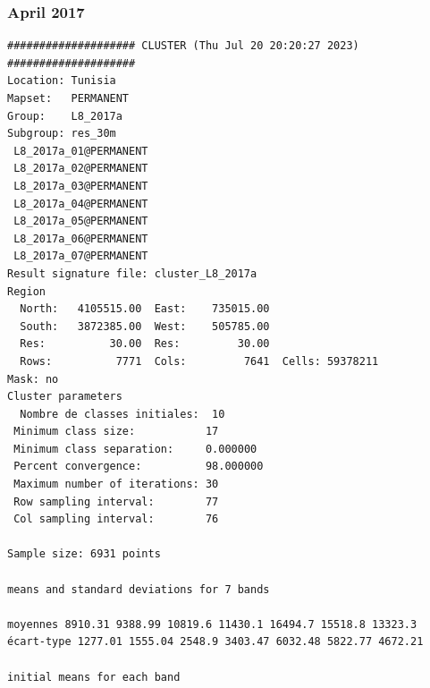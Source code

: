 \documentclass[environments,article,submit,pdftex,moreauthors]{Definitions/mdpi}
\begin{document}
\subsubsection[\appendixname~\thesubsubsection]{April 2017}
\begin{scriptsize}
\begin{verbatim}
#################### CLUSTER (Thu Jul 20 20:20:27 2023) ####################
Location: Tunisia
Mapset:   PERMANENT
Group:    L8_2017a
Subgroup: res_30m
 L8_2017a_01@PERMANENT
 L8_2017a_02@PERMANENT
 L8_2017a_03@PERMANENT
 L8_2017a_04@PERMANENT
 L8_2017a_05@PERMANENT
 L8_2017a_06@PERMANENT
 L8_2017a_07@PERMANENT
Result signature file: cluster_L8_2017a
Region
  North:   4105515.00  East:    735015.00
  South:   3872385.00  West:    505785.00
  Res:          30.00  Res:         30.00
  Rows:          7771  Cols:         7641  Cells: 59378211
Mask: no
Cluster parameters
  Nombre de classes initiales: 	10
 Minimum class size:           17
 Minimum class separation:     0.000000
 Percent convergence:          98.000000
 Maximum number of iterations: 30
 Row sampling interval:        77
 Col sampling interval:        76

Sample size: 6931 points

means and standard deviations for 7 bands

moyennes 8910.31 9388.99 10819.6 11430.1 16494.7 15518.8 13323.3
écart-type 1277.01 1555.04 2548.9 3403.47 6032.48 5822.77 4672.21

initial means for each band


\end{verbatim}
\end{scriptsize}
\end{document}
